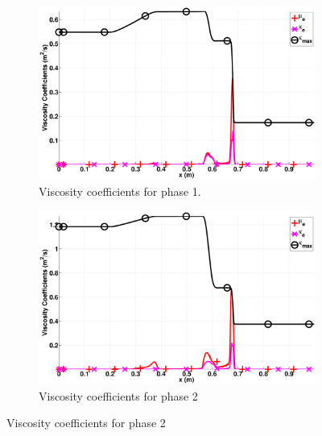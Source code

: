 \documentclass[preprint,10pt]{elsarticle}
\begin{document}
%
\begin{figure}[H]
        \centering
        \begin{subfigure}[b]{0.495\textwidth}
                \centering
                \includegraphics[width=\textwidth]{figures/relaxation_phase_1_viscosity_kappa_mu.eps}
                \caption{Viscosity coefficients for phase 1.}
                \label{fig:inf-rel-visc-coeff-phase-1}
        \end{subfigure}%
        \begin{subfigure}[b]{0.495\textwidth}
                \centering
                \includegraphics[width=\textwidth]{figures/relaxation_phase_2_viscosity_kappa_mu.eps}
                \caption{Viscosity coefficients for phase 2}
                \label{fig:inf-rel-visc-coeff-phase-2}
        \end{subfigure}
        

\end{figure}
\end{document}
